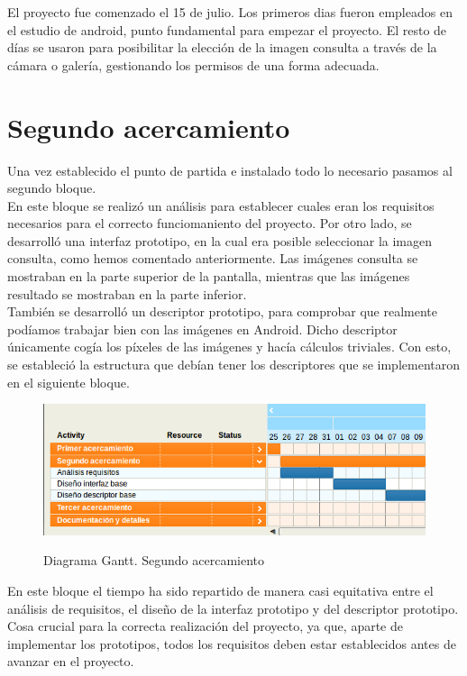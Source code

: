 El proyecto fue comenzado el 15 de julio. Los primeros dias fueron empleados en el estudio de android, punto fundamental para empezar el proyecto. El resto de días se usaron para posibilitar la elección de la imagen consulta a través de la cámara o galería, gestionando los permisos de una forma adecuada.

\section{Segundo acercamiento}

Una vez establecido el punto de partida e instalado todo lo necesario pasamos al segundo bloque.\\

En este bloque se realizó un análisis para establecer cuales eran los requisitos necesarios para el correcto funciomaniento del proyecto.
Por otro lado, se desarrolló una interfaz prototipo, en la cual era posible seleccionar la imagen consulta, como hemos comentado anteriormente. Las imágenes consulta se mostraban en la parte superior de la pantalla, mientras que las imágenes resultado se mostraban en la parte inferior.\\

También se desarrolló un descriptor prototipo, para comprobar que realmente podíamos trabajar bien con las imágenes en Android. Dicho descriptor únicamente cogía los píxeles de las imágenes y hacía cálculos triviales. Con esto, se estableció la estructura que debían tener los descriptores que se implementaron en el siguiente bloque.

\begin{figure}[H] %
\centering
\includegraphics[scale=0.5]{imagenes/gant2.png}  %
\label{gant2.png}
\caption{Diagrama Gantt. Segundo acercamiento}
\end{figure}

En este bloque el tiempo ha sido repartido de manera casi equitativa entre el análisis de requisitos, el diseño de la interfaz prototipo y del descriptor prototipo. Cosa crucial para la correcta realización del proyecto, ya que, aparte de implementar los prototipos, todos los requisitos deben estar establecidos antes de avanzar en el proyecto.\\

